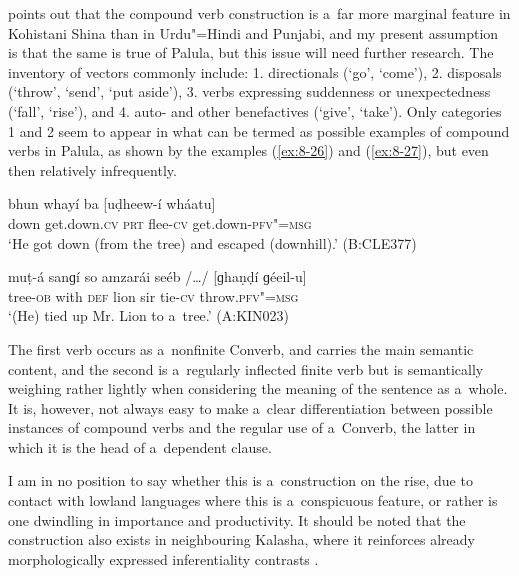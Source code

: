 \citet[20]{schmidt2004} points out that the compound verb construction is a~far more marginal feature in Kohistani Shina than in Urdu"=Hindi and Punjabi, and my present assumption is that the same is true of Palula, but this issue will need further research. The inventory of vectors commonly include: 1. directionals (`go', `come'), 2. disposals (`throw', `send', `put aside'), 3. verbs expressing suddenness or unexpectedness (`fall', `rise'), and 4. auto- and other benefactives (`give', `take'). Only categories 1 and 2 seem to appear in what can be termed as possible examples of compound verbs in Palula, as shown by the examples (\ref{ex:8-26}) and (\ref{ex:8-27}), but even then relatively infrequently. 

\begin{exe}
\ex
\label{ex:8-26}
\gll bhun whayí ba [uḍheew-í wháatu] \\
down get.down.\textsc{cv} \textsc{prt} flee-\textsc{cv} get.down-\textsc{pfv"=msg} \\
\glt `He got down (from the tree) and escaped (downhill).' (B:CLE377)
\end{exe}
\begin{exe}
\ex
\label{ex:8-27}
\gll muṭ-á sanɡí so amzarái seéb /{\ldots}/ [ɡhaṇḍí ɡéeil-u] \\
tree-\textsc{ob} with \textsc{def} lion sir {} tie-\textsc{cv} throw.\textsc{pfv"=msg} \\
\glt `(He) tied up Mr. Lion to a~tree.' (A:KIN023)
\end{exe}

The first verb occurs as a~nonfinite Converb, and carries the main semantic content, and the second is a~regularly inflected finite verb but is semantically weighing rather lightly when considering the meaning of the sentence as a~whole. It is, however, not always easy to make a~clear differentiation between possible instances of compound verbs and the regular use of a~Converb, the latter in which it is the head of a~dependent clause. 



I am in no position to say whether this is a~construction on the rise, due to contact with lowland languages where this is a~conspicuous feature, or rather is one dwindling in importance and productivity. It should be noted that the construction also exists in neighbouring Kalasha, where it reinforces already morphologically expressed inferentiality contrasts \citep[1--4]{bashir1993}.

